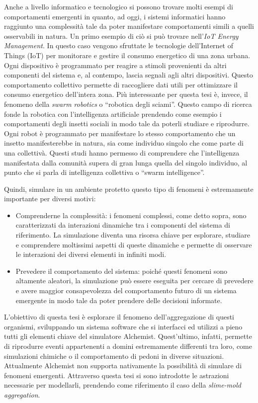 Anche a livello informatico e tecnologico si possono trovare molti esempi di comportamenti emergenti in quanto, ad oggi, i sistemi informatici hanno 
raggiunto una complessità tale da poter manifestare comportamenti simili a quelli osservabili in natura.
Un primo esempio di ciò si può trovare nell'\textit{IoT Energy Management}. In questo caso vengono sfruttate le tecnologie dell'Internet of Things (IoT)
per monitorare e gestire il consumo energetico di una zona urbana. Ogni dispositivo è programmato per reagire a stimoli provenienti da altri componenti del sistema e, al contempo,
lascia segnali agli altri dispositivi. Questo comportamento collettivo permette di raccogliere dati utili per ottimizzare il consumo energetico dell'intera zona.
Più interessante per questa tesi è, invece, il fenomeno della \textit{swarm robotics} o ``robotica degli sciami''. Questo campo di ricerca fonde la robotica con l'intelligenza artificiale 
prendendo come esempio i comportamenti degli insetti sociali in modo tale da poterli studiare e riprodurre. Ogni robot è programmato per manifestare lo stesso comportamento 
che un insetto manifesterebbe in natura, sia come individuo singolo che come parte di una collettivà. Questi studi hanno permesso di comprendere che
l'intelligenza manifestata dalla comunità supera di gran lunga quella del singolo individuo, al punto che si parla di intelligenza collettiva o ``swarm intelligence''.

Quindi, simulare in un ambiente protetto questo tipo di fenomeni è estremamente importante per diversi motivi:
\begin{itemize}
    \item Comprenderne la complessità: i fenomeni complessi, come detto sopra, sono caratterizzati da interazioni dinamiche tra
    i componenti del sistema di riferimento. La simulazione diventa una risorsa chiave per esplorare, studiare e comprendere 
    moltissimi aspetti di queste dinamiche e permette di osservare le interazioni dei diversi elementi in infiniti modi.
    \item Prevedere il comportamento del sistema: poiché questi fenomeni sono altamente aleatori, la simulazione può essere 
    eseguita per cercare di prevedere e avere maggior consapevolezza del comportamento
    futuro di un sistema emergente in modo tale da poter prendere delle decisioni informate.   
\end{itemize}

L'obiettivo di questa tesi è esplorare il fenomeno dell'aggregazione di questi organismi, sviluppando un sistema software che 
si interfacci ed utilizzi a pieno tutti gli elementi chiave del simulatore Alchemist. Quest'ultimo, infatti, permette di riprodurre eventi appartenenti 
a domini estremamente differenti tra loro, come simulazioni chimiche o il comportamento di pedoni in diverse situazioni. Attualmente Alchemist 
non supporta nativamente la possibilità di simulare di fenomeni emergenti. Attraverso questa tesi si sono introdotte
le astrazioni necessarie per modellarli, prendendo come riferimento il caso della \textit{slime-mold aggregation}.

